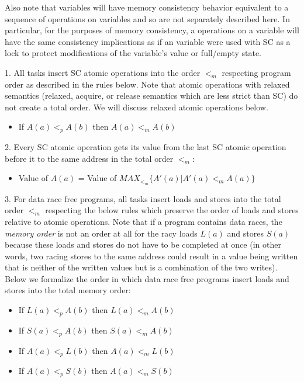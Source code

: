 Also note that  variables will have memory consistency behavior
equivalent to a sequence of operations on  variables and so are
not separately described here. In particular, for the purposes of memory
consistency, a operations on a  variable will have the same
consistency implications as if an  variable were used with
SC as a lock to protect modifications of the 
variable's value or full/empty state.


1. All tasks insert SC atomic operations into the order $<_m$ respecting
program order as described in the rules below. Note that atomic operations with
relaxed semantics (relaxed, acquire, or release semantics which are less strict
than SC) do not create a total order. We will discuss relaxed atomic operations
below.

\begin{itemize}
  \item If $A(a)<_pA(b)$ then $A(a)<_mA(b)$
\end{itemize}

2. Every SC atomic operation gets its value from the last SC atomic operation before it to the same address in the total order $<_m$:
\begin{itemize}
  \item Value of $A(a)$ = Value of $MAX_{<_m} \{A'(a)|A'(a) <_m A(a) \}$
\end{itemize}

3. For data race free programs, all tasks insert loads and stores into the
total order $<_m$ respecting the below rules which preserve the order of loads
and stores relative to atomic operations.  Note that if a program contains data
races, the \textit{memory order} is not an order at all for the racy loads
$L(a)$ and stores $S(a)$ because these loads and stores do not have to be
completed at once (in other words, two racing stores to the same address could
result in a value being written that is neither of the written values but is a
combination of the two writes). Below we formalize the order in which data race free programs insert loads and stores into the total memory order:
\begin{itemize}
  \item If $L(a)<_pA(b)$ then $L(a)<_mA(b)$
  \item If $S(a)<_pA(b)$ then $S(a)<_mA(b)$
  \item If $A(a)<_pL(b)$ then $A(a)<_mL(b)$
  \item If $A(a)<_pS(b)$ then $A(a)<_mS(b)$
\end{itemize}

